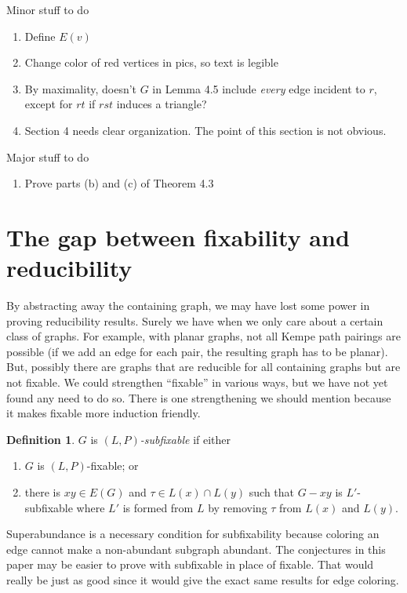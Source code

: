 \documentclass[12pt]{article}
\theoremstyle{plain}
\theoremstyle{definition}
\newtheorem{defn}{Definition}
\theoremstyle{remark}
\begin{document}
Minor stuff to do
\begin{enumerate}
\item Define $E(v)$
\item Change color of red vertices in pics, so text is legible
\item By maximality, doesn't $G$ in Lemma 4.5 include \emph{every} edge incident
to $r$, except for $rt$ if $rst$ induces a triangle?
\item Section 4 needs clear organization.  The point of this section is not
obvious.
\end{enumerate}

Major stuff to do
\begin{enumerate}
\item Prove parts (b) and (c) of Theorem 4.3
\end{enumerate}

\section{The gap between fixability and reducibility}
By abstracting away the containing graph, we may have lost some power in proving reducibility results. Surely we have when we only care about a certain class of graphs. For example, with planar graphs, not all Kempe path pairings are possible (if we add an edge for each pair, the resulting graph has to be planar).  But, possibly there are graphs that are reducible for all containing graphs but are not fixable.  We could strengthen ``fixable'' in various ways, but we have not yet found any need to do so.  There is one strengthening we should mention because it makes fixable more induction friendly.  

\begin{defn}
$G$ is \emph{$(L, P)$-subfixable} if either
\begin{enumerate}
\item[(1)] $G$ is $(L, P)$-fixable; or
\item[(2)] there is $xy \in E(G)$ and $\tau \in L(x) \cap L(y)$ such that $G-xy$ is $L'$-subfixable where $L'$ is formed from $L$ by removing $\tau$ from $L(x)$ and $L(y)$.
\end{enumerate}
\end{defn}

Superabundance is a necessary condition for subfixability because coloring an edge cannot make a non-abundant subgraph abundant.  The conjectures in this paper may be easier to prove with subfixable in place of fixable.  That would really be just as good since it would give the exact same results for edge coloring.



\end{document}
